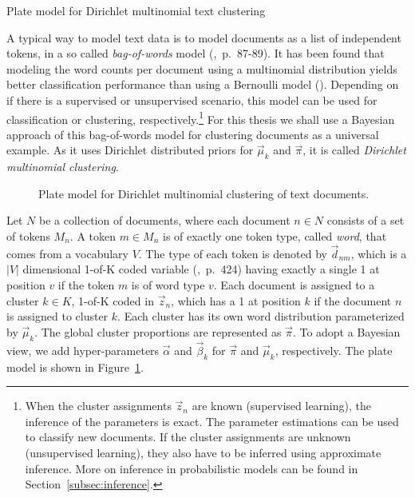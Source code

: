 \begin{Example} Plate model for Dirichlet multinomial text clustering
\label{ex:clustering-pm}

A typical way to model text data is to model documents as a list of independent tokens, in a so called \emph{bag-of-words} model (\cite{murphy2012machine},~p.~87-89). It has been found that modeling the word counts per document using a multinomial distribution yields better classification performance than using a Bernoulli model (\cite{mccallum1998comparison}). Depending on if there is a supervised or unsupervised scenario, this model can be used for classification or clustering, respectively.\footnote{When the cluster assignments $\vec z_n$ are known (supervised learning), the inference of the parameters is exact. The parameter estimations can be used to classify new documents. If the cluster assignments are unknown (unsupervised learning), they also have to be inferred using approximate inference. More on inference in probabilistic models can be found in Section~\ref{subsec:inference}.} For this thesis we shall use a Bayesian approach of this bag-of-words model for clustering documents as a universal example. As it uses Dirichlet distributed priors for $\vec \mu_k$ and $\vec \pi$, it is called \emph{Dirichlet multinomial clustering}.

\begin{figure}[t]
	\begin{center}
    	\scalebox{\tikzScale}{\adjustTikzSize }
	\end{center}
\caption[Plate model for Dirichlet multinomial clustering of text documents]{Plate model for Dirichlet multinomial clustering of text documents.}
		\label{fig:clustering_platemodel}
\end{figure}

Let $N$ be a collection of documents, where each document $n \in N$ consists of a set of tokens $M_n$. A token $m \in M_n$ is of exactly one token type, called \emph{word}, that comes from a vocabulary $V$. The type of each token is denoted by $\vec d_{nm}$, which is a $|V|$ dimensional 1-of-K coded variable (\cite{bishop2006pattern},~p.~424) having exactly a single 1 at position $v$ if the token $m$ is of word type $v$. Each document is assigned to a cluster $k \in K$, 1-of-K coded in $\vec z_{n}$, which has a 1 at position $k$ if the document $n$ is assigned to cluster $k$. Each cluster has its own word distribution parameterized by $\vec \mu_k$. The global cluster proportions are represented as $\vec \pi$. To adopt a Bayesian view, we add hyper-parameters $\vec \alpha$ and $\vec \beta_k$ for $\vec \pi$ and $\vec \mu_k$, respectively. The plate model is shown in Figure~\ref{fig:clustering_platemodel}.


\end{Example}
